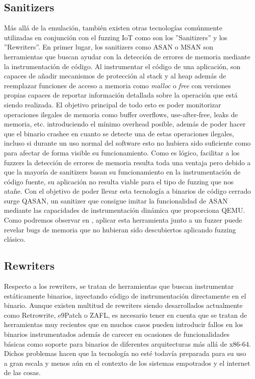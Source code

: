 \subsection{Sanitizers}
Más allá de la emulación, también existen otras tecnologías comúnmente utilizadas en conjunción con el fuzzing IoT como son los ''Sanitizers'' y los
''Rewriters''. En primer lugar, los sanitizers como ASAN\cite{Serebryany2012} o MSAN\cite{Stepanov2015} son herramientas que buscan ayudar con la detección de errores de memoria mediante la instrumentación 
de código. Al instrumentar el código de una aplicación, son capaces de añadir mecanismos de protección al stack y al heap además de reemplazar funciones
de acceso a memoria como \textit{malloc} o \textit{free} con versiones propias capaces de reportar información detallada sobre la operación que está siendo 
realizada. El objetivo principal de todo esto es poder monitorizar operaciones ilegales de memoria como buffer overflows,
use-after-free, leaks de memoria, etc. introduciendo el mínimo overhead posible, además de poder hacer que el binario crashee en cuanto se detecte una de estas
operaciones ilegales, incluso si durante un uso normal del software esto no hubiera sido suficiente como para afectar de forma visible su funcionamiento. 
Como es lógico, facilitar a los fuzzers la detección de errores de memoria resulta toda una ventaja pero debido a que la mayoría de sanitizers basan su
funcionamiento en la instrumentación de código fuente, su aplicación no resulta viable para el tipo de fuzzing que nos atañe. Con el objetivo de poder 
llevar esta tecnología a binarios de código cerrado surge QASAN\cite{Fioraldi2020}, un sanitizer que consigue imitar la funcionalidad de ASAN\cite{Serebryany2012} 
mediante las capacidades de instrumentación dinámica que proporciona QEMU. Como podremos observar en , aplicar esta herramienta 
junto a un fuzzer puede revelar bugs de memoria que no hubieran sido descubiertos aplicando fuzzing clásico. \bigskip

\subsection{Rewriters}
Respecto a los rewriters, se tratan de herramientas que buscan instrumentar estáticamente binarios, inyectando código de instrumentación directamente en 
el binario. Aunque existen multitud de rewriters siendo desarrollados actualmente como Retrowrite\cite{Dinesh2020}, e9Patch\cite{Duck2020} o 
ZAFL\cite{Nagy2021}, es necesario tener en cuenta que se tratan de herramientas muy recientes que en muchos casos pueden introducir fallos en los binarios
instrumentados además de carecer en ocasiones de funcionalidades básicas como soporte para binarios de diferentes arquitecturas más allá de x86-64. 
Dichos problemas hacen que la tecnología no esté todavía preparada para su uso a gran escala y menos aún en el contexto de los sistemas empotrados y el 
internet de las cosas.
\bigskip

